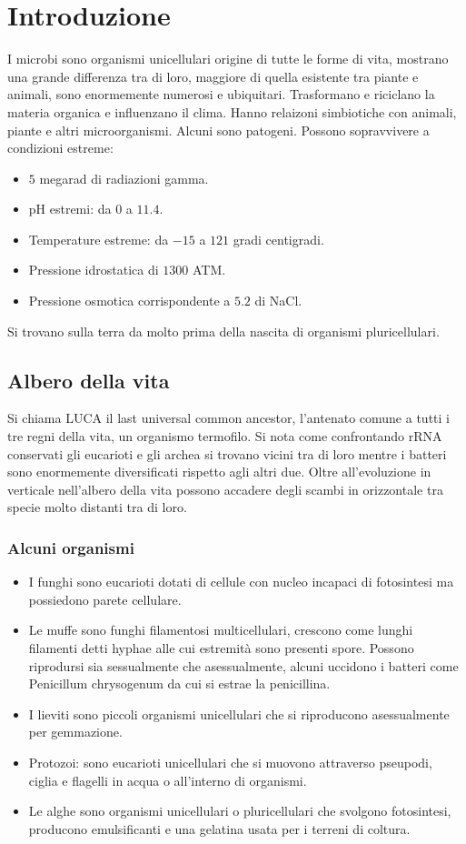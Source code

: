 \chapter{Introduzione}
I microbi sono organismi unicellulari origine di tutte le forme di vita, mostrano una grande differenza tra di loro, maggiore di quella esistente tra piante
e animali, sono enormemente numerosi e ubiquitari. Trasformano e riciclano la materia organica e influenzano il clima. Hanno relaizoni simbiotiche con 
animali, piante e altri microorganismi. Alcuni sono patogeni. Possono sopravvivere a condizioni estreme:
\begin{itemize}
\item $5$ megarad di radiazioni gamma.
\item pH estremi: da $0$ a $11.4$.
\item Temperature estreme: da $-15$ a $121$ gradi centigradi.
\item Pressione idrostatica di $1300$ ATM.
\item Pressione osmotica corrispondente a $5.2$ di NaCl.
\end{itemize}
Si trovano sulla terra da molto prima della nascita di organismi pluricellulari. 
\section{Albero della vita}
Si chiama LUCA il last universal common ancestor, l'antenato comune a tutti i tre regni della vita, un organismo termofilo. Si nota come confrontando rRNA conservati gli eucarioti e 
gli archea si trovano vicini tra di loro mentre i batteri sono enormemente diversificati rispetto agli altri due. Oltre all'evoluzione in verticale nell'albero della vita possono 
accadere degli scambi in orizzontale tra specie molto distanti tra di loro. 
\subsection{Alcuni organismi}
\begin{itemize}
	\item I funghi sono eucarioti dotati di cellule con nucleo incapaci di fotosintesi ma possiedono parete cellulare. 
	\item Le muffe sono funghi filamentosi multicellulari, crescono come lunghi filamenti detti hyphae alle cui estremit\`a sono presenti spore. Possono riprodursi sia sessualmente
		che asessualmente, alcuni uccidono i batteri come Penicillum chrysogenum da cui si estrae la penicillina.
	\item I lieviti sono piccoli organismi unicellulari che si riproducono asessualmente per gemmazione. 
	\item Protozoi: sono eucarioti unicellulari che si muovono attraverso pseupodi, ciglia e flagelli in acqua o all'interno di organismi.
	\item Le alghe sono organismi unicellulari o pluricellulari che svolgono fotosintesi, producono emulsificanti e una gelatina usata per i terreni di coltura. 
\end{itemize}
